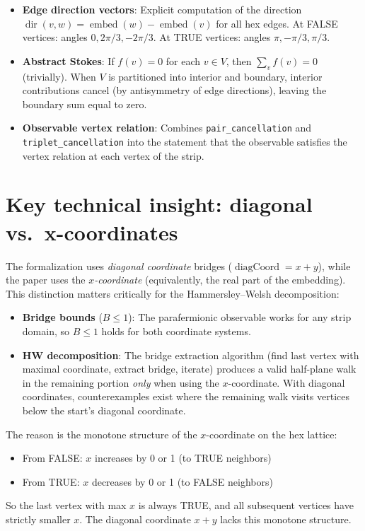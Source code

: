 \begin{lemma}
\begin{enumerate}
\begin{itemize}
  \item \textbf{Edge direction vectors}: Explicit computation of the
    direction $\operatorname{dir}(v,w) = \operatorname{embed}(w) - \operatorname{embed}(v)$
    for all hex edges. At FALSE vertices: angles $0, 2\pi/3, -2\pi/3$.
    At TRUE vertices: angles $\pi, -\pi/3, \pi/3$.
  \item \textbf{Abstract Stokes}: If $f(v) = 0$ for each $v \in V$,
    then $\sum_v f(v) = 0$ (trivially). When $V$ is partitioned into
    interior and boundary, interior contributions cancel (by antisymmetry
    of edge directions), leaving the boundary sum equal to zero.
  \item \textbf{Observable vertex relation}: Combines
    \texttt{pair\_cancellation} and \texttt{triplet\_cancellation} into
    the statement that the observable satisfies the vertex relation at
    each vertex of the strip.
\end{itemize}

\section{Key technical insight: diagonal vs.\ x-coordinates}

The formalization uses \emph{diagonal coordinate} bridges
($\operatorname{diagCoord} = x + y$), while the paper uses the
\emph{$x$-coordinate} (equivalently, the real part of the embedding).
This distinction matters critically for the Hammersley--Welsh
decomposition:

\begin{itemize}
  \item \textbf{Bridge bounds} ($B \leq 1$): The parafermionic
    observable works for any strip domain, so $B \leq 1$ holds for
    both coordinate systems. \checkmark
  \item \textbf{HW decomposition}: The bridge extraction algorithm
    (find last vertex with maximal coordinate, extract bridge,
    iterate) produces a valid half-plane walk in the remaining
    portion \emph{only} when using the $x$-coordinate. With diagonal
    coordinates, counterexamples exist where the remaining walk
    visits vertices below the start's diagonal coordinate.
\end{itemize}

The reason is the monotone structure of the $x$-coordinate on the
hex lattice:
\begin{itemize}
  \item From FALSE: $x$ increases by 0 or 1 (to TRUE neighbors)
  \item From TRUE: $x$ decreases by 0 or 1 (to FALSE neighbors)
\end{itemize}
So the last vertex with max $x$ is always TRUE, and all subsequent
vertices have strictly smaller $x$. The diagonal coordinate $x+y$
lacks this monotone structure.


\end{enumerate}
\end{lemma}
